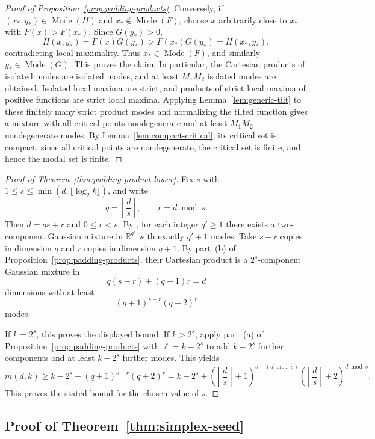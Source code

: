 \documentclass[11pt]{article}
\theoremstyle{plain}
\theoremstyle{definition}
\theoremstyle{remark}
\numberwithin{equation}{section}
\DeclareMathOperator{\Mode}{Mode}
\newcommand{\R}{\mathbb{R}}
\begin{document}
\begin{proof}[Proof of Proposition~\ref{prop:padding-products}]
Conversely, if $(x_\ast,y_\ast)\in\Mode(H)$ and $x_\ast\notin\Mode(F)$, choose $x$ arbitrarily close to $x_\ast$ with $F(x)>F(x_\ast)$. Since $G(y_\ast)>0$,
\[
H(x,y_\ast)=F(x)G(y_\ast)>F(x_\ast)G(y_\ast)=H(x_\ast,y_\ast),
\]
contradicting local maximality. Thus $x_\ast\in\Mode(F)$, and similarly $y_\ast\in\Mode(G)$. This proves the claim. In particular, the Cartesian products of isolated modes are isolated modes, and at least $M_1M_2$ isolated modes are obtained. Isolated local maxima are strict, and products of strict local maxima of positive functions are strict local maxima. Applying Lemma~\ref{lem:generic-tilt} to these finitely many strict product modes and normalizing the tilted function gives a mixture with all critical points nondegenerate and at least $M_1M_2$ nondegenerate modes. By Lemma~\ref{lem:compact-critical}, its critical set is compact; since all critical points are nondegenerate, the critical set is finite, and hence the modal set is finite.
\end{proof}

\begin{proof}[Proof of Theorem~\ref{thm:padding-product-lower}]
Fix $s$ with $1\le s\le \min(d,\lfloor \log_2 k\rfloor)$, and write
\[
q=\left\lfloor\frac{d}{s}\right\rfloor,
\qquad
r=d\bmod s.
\]
Then $d=qs+r$ and $0\le r<s$. By \citet{RayRen2012}, for each integer $q'\ge 1$ there exists a two-component Gaussian mixture in $\R^{q'}$ with exactly $q'+1$ modes. Take $s-r$ copies in dimension $q$ and $r$ copies in dimension $q+1$. By part~(b) of Proposition~\ref{prop:padding-products}, their Cartesian product is a $2^s$-component Gaussian mixture in
\[
q(s-r)+(q+1)r=d
\]
dimensions with at least
\[
(q+1)^{s-r}(q+2)^r
\]
modes.

If $k=2^s$, this proves the displayed bound. If $k>2^s$, apply part~(a) of Proposition~\ref{prop:padding-products} with $\ell=k-2^s$ to add $k-2^s$ further components and at least $k-2^s$ further modes. This yields
\[
m(d,k)\ge k-2^s+(q+1)^{s-r}(q+2)^r
= k-2^s+\left(\left\lfloor\frac{d}{s}\right\rfloor+1\right)^{s-(d\bmod s)}
\left(\left\lfloor\frac{d}{s}\right\rfloor+2\right)^{d\bmod s}.
\]
This proves the stated bound for the chosen value of $s$.
\end{proof}

\subsection{Proof of Theorem~\ref{thm:simplex-seed}}\label{subsec:simplex-seed-proof}
\end{document}
